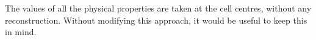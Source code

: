 The values of all the physical properties are taken at the cell centres, 
without any reconstruction. Without modifying this approach, it would be 
useful to keep this in mind.

%
%
%
%
%



